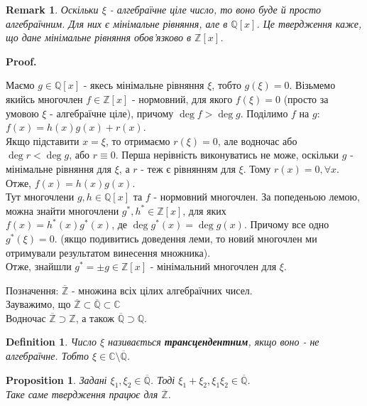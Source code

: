 \documentclass[a4paper, 10pt]{article}
\makeatletter
\theoremstyle{theoremdd}
\theoremstyle{theoremdd}
\newtheorem{definition}[theorem]{Definition}
\theoremstyle{theoremdd}
\theoremstyle{theoremdd}
\theoremstyle{theoremdd}
\newtheorem{proposition}[theorem]{Proposition}
\theoremstyle{theoremdd}
\newtheorem{remark}[theorem]{Remark}
\theoremstyle{theoremdd}
\theoremstyle{theoremdd}
\renewenvironment{proof}[1][Proof.\\]{\par
\pushQED{\hfill \qed}%
\normalfont \topsep6\p@\@plus6\p@\relax
\trivlist
\item\relax
{\bfseries
#1\@addpunct{.}}\hspace\labelsep\ignorespaces
}{%
\popQED\endtrivlist\@endpefalse
}
\makeatother
\begin{document}
\begin{remark}
Оскільки $\xi$ - алгебраїчне ціле число, то воно буде й просто алгебраїчним. Для них є мінімальне рівняння, але в $\mathbb{Q}[x]$. Це твердження каже, що дане мінімальне рівняння обов'язково в $\mathbb{Z}[x]$.
\end{remark}

\begin{proof}
Маємо $g \in \mathbb{Q}[x]$ - якесь мінімальне рівняння $\xi$, тобто $g(\xi) = 0$. Візьмемо якийсь многочлен $f \in \mathbb{Z}[x]$ - нормовний, для якого $f(\xi) = 0$ (просто за умовою $\xi$ - алгебраїчне ціле), причому $\deg f > \deg g$. Поділимо $f$ на $g$:\\
$f(x) = h(x)g(x) + r(x)$.\\
Якщо підставити $x = \xi$, то отримаємо $r(\xi) = 0$, але водночас або $\deg r < \deg g$, або $r \equiv 0$. Перша нерівність виконуватись не може, оскільки $g$ - мінімальне рівняння для $\xi$, а $r$ - теж є рівнянням для $\xi$. Тому $r(x) = 0, \forall x$.\\
Отже, $f(x) = h(x)g(x)$.\\
Тут многочлени $g,h \in \mathbb{Q}[x]$ та $f$ - нормовний многочлен. За попеденьою лемою, можна знайти многочлени $g^*,h^* \in \mathbb{Z}[x]$, для яких\\
$f(x) = h^*(x)g^*(x)$, де $\deg g^*(x) = \deg g(x)$. Причому все одно $g^*(\xi) = 0$. (якщо подивитись доведення леми, то новий многочлен ми отримували результатом винесення множника).\\
Отже, знайшли $g^* = \pm g \in \mathbb{Z}[x]$ - мінімальний многочлен для $\xi$.
\end{proof}

Позначення: $\overline{\mathbb{Z}}$ - множина всіх цілих алгебраїчних чисел.
\bigskip \\
Зауважимо, що $\overline{\mathbb{Z}} \subset \overline{\mathbb{Q}} \subset \mathbb{C}$\\
Водночас $\overline{\mathbb{Z}} \supset \mathbb{Z}$, а також $\overline{\mathbb{Q}} \supset \mathbb{Q}$.

\begin{definition}
Число $\xi$ називається \textbf{трансцендентним}, якщо воно - не алгебраїчне. Тобто $\xi \in \mathbb{C} \setminus \overline{\mathbb{Q}}$.
\end{definition}

\begin{proposition}
Задані $\xi_1,\xi_2 \in \overline{\mathbb{Q}}$. Тоді $\xi_1+\xi_2, \xi_1 \xi_2 \in \overline{\mathbb{Q}}$.\\
\textit{Таке саме твердження працює для $\overline{\mathbb{Z}}$.}
\end{proposition}
\end{document}
